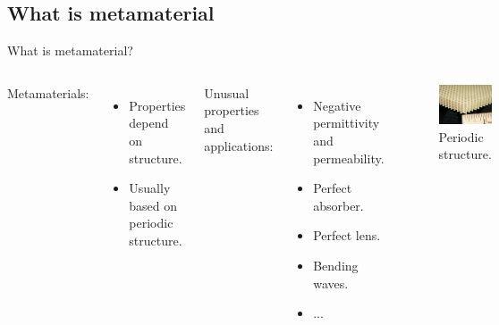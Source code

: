 \subsection{What is metamaterial}

\begin{frame}{What is metamaterial?}
    \begin{columns}
        Metamaterials:
        \begin{itemize}
            \item Properties depend on structure.
            \item Usually based on periodic structure.
        \end{itemize}
        \vspace{1mm}
        Unusual properties and applications:
        \begin{itemize}
            \item Negative permittivity and permeability.
            \item Perfect absorber.
            \item Perfect lens.
            \item Bending waves.
            \item ...
        \end{itemize}
        \begin{figure}
            \centering
            \includegraphics[width=\textwidth]{Figures/Meta_DN.pdf}
            \caption{Periodic structure. \cite{10.1063/1.1850590}}
            \label{fig:Periodic_structure}
        \end{figure}
    \end{columns}
\end{frame}